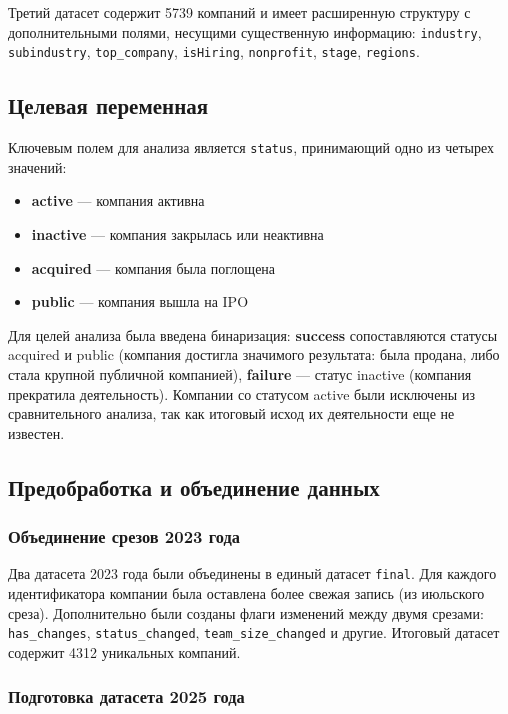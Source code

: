 Третий датасет содержит 5739 компаний и имеет расширенную структуру с дополнительными полями, несущими существенную информацию: \texttt{industry}, \texttt{subindustry}, \texttt{top\_company}, \texttt{isHiring}, \texttt{nonprofit}, \texttt{stage}, \texttt{regions}.

\subsection{Целевая переменная}

Ключевым полем для анализа является \texttt{status}, принимающий одно из четырех значений:

\begin{itemize}
    \item \textbf{active} --- компания активна
    \item \textbf{inactive} --- компания закрылась или неактивна
    \item \textbf{acquired} --- компания была поглощена
    \item \textbf{public} --- компания вышла на IPO
\end{itemize}

Для целей анализа была введена бинаризация: \textbf{success} сопоставляются статусы acquired и public (компания достигла значимого результата: была продана, либо стала крупной публичной компанией), \textbf{failure} --- статус inactive (компания прекратила деятельность). Компании со статусом active были исключены из сравнительного анализа, так как итоговый исход их деятельности еще не известен.

\subsection{Предобработка и объединение данных}

\subsubsection{Объединение срезов 2023 года}

Два датасета 2023 года были объединены в единый датасет \texttt{final}. Для каждого идентификатора компании была оставлена более свежая запись (из июльского среза). Дополнительно были созданы флаги изменений между двумя срезами: \texttt{has\_changes}, \texttt{status\_changed}, \texttt{team\_size\_changed} и другие. Итоговый датасет содержит 4312 уникальных компаний.

\subsubsection{Подготовка датасета 2025 года}


